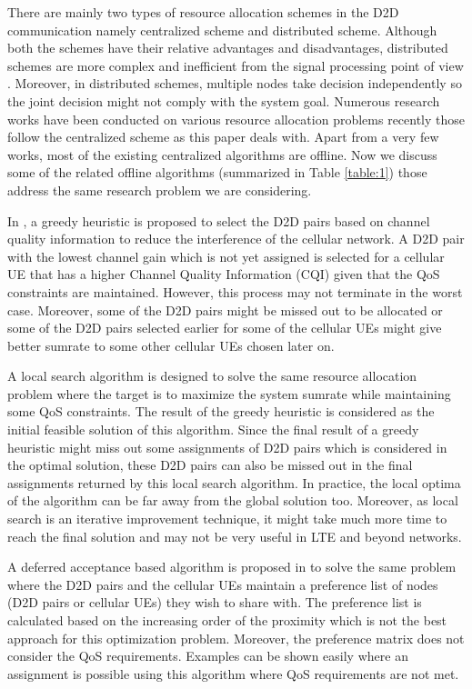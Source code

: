 \documentclass[times]{dacauth}
\begin{document}
\smallskip
\noindent
There are mainly two types of resource allocation schemes in the D2D communication namely centralized scheme and distributed scheme. Although both the schemes have their relative advantages and disadvantages, distributed schemes are more complex and inefficient from the signal processing point of view \cite{asadi2014survey}. Moreover, in distributed schemes, multiple nodes take decision independently so the joint decision might not comply with the system goal. Numerous research works have been conducted on various resource allocation problems recently those follow the centralized scheme as this paper deals with. Apart from a very few works, most of the existing centralized algorithms are offline. Now we discuss some of the related offline algorithms (summarized in Table \ref{table:1}) those address the same research problem we are considering.

\smallskip
\noindent
In \cite{zulhasnine}, a greedy heuristic is proposed to select the D2D pairs based on channel quality information to reduce the interference of the cellular network. A D2D pair with the lowest channel gain which is not yet assigned is selected for a cellular UE that has a higher Channel Quality Information (CQI) given that the QoS constraints are maintained. However, this process may not terminate in the worst case. Moreover, some of the D2D pairs might be missed out to be allocated or some of the D2D pairs selected earlier for some of the cellular UEs might give better sumrate to some other cellular UEs chosen later on. 

\smallskip
\noindent
A local search algorithm \cite{lora} is designed to solve the same resource allocation problem where the target is to maximize the system sumrate while maintaining some QoS constraints. The result of the greedy heuristic \cite{zulhasnine} is considered as the initial feasible solution of this algorithm. Since the final result of a greedy heuristic might miss out some assignments of D2D pairs which is considered in the optimal solution, these D2D pairs can also be missed out in the final assignments returned by this local search algorithm. In practice, the local optima of the algorithm can be far away from the global solution too. Moreover, as local search is an iterative improvement technique, it might take much more time to reach the final solution and may not be very useful in LTE and beyond networks.

\smallskip
\noindent
A deferred acceptance based algorithm is proposed in \cite{dara} to solve the same problem where the D2D pairs and the cellular UEs maintain a preference list of nodes (D2D pairs or cellular UEs) they wish to share with. The preference list is calculated based on the increasing order of the proximity which is not the best approach for this optimization problem. Moreover, the preference matrix does not consider the QoS requirements. Examples can be shown easily where an assignment is possible using this algorithm where QoS requirements are not met.
\end{document}
